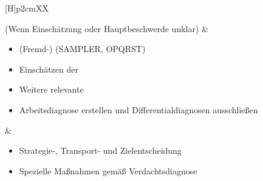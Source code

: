 \begin{BoxA}[%
title={Standardmaßnahme YY12100B: Einschätzungsblock},
fonttitle=\sffamily\bfseries\small,fontupper=\sffamily\small,
colframe=Base,
colback=MarginBackground,
]
\begin{minipage}[t]{\linewidth -
{2\fboxrule} - {2\fboxsep}}
\begin{minipage}[t]{\linewidth}
{\begin{tabularx}{\linewidth}[H]{p{2cm}XX}

{\tiny (Wenn Einschätzung oder Hauptbeschwerde unklar)}
&
\begin{minipage}[t]{\linewidth}
\begin{itemize}
  \item (Fremd-)  (SAMPLER, OPQRST)
  \item Einschätzen der 
  \item Weitere relevante 
  \item Arbeitsdiagnose erstellen und Differentialdiagnosen
  ausschließen
\end{itemize}
\end{minipage}
&
\noindent\color{DefaultA}\begin{minipage}[t]{\linewidth}
\begin{itemize}
  \item Strategie-, Transport- und Zielentscheidung 
  \item Spezielle Maßnahmen gemäß Verdachtsdiagnose
\end{itemize}
\end{minipage}
\\\addlinespace\bottomrule
\end{tabularx}

\begin{center}
   \tiny


\end{center}}
\end{minipage}
\end{minipage}
\end{BoxA}
